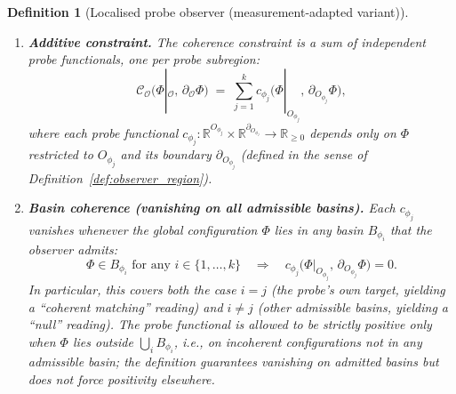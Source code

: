 \documentclass[12pt]{article}
\newtheorem{definition}[theorem]{Definition}
\newcommand{\Ocal}{\mathcal{O}}
\newcommand{\Ccal}{\mathcal{C}}
\begin{document}
\begin{definition}[Localised probe observer (measurement-adapted variant)]
\begin{enumerate}
    \item \textbf{Additive constraint.} The coherence constraint is a sum of independent probe functionals, one per probe subregion:
    \begin{equation}\label{eq:additive}
        \Ccal_\Ocal\!\bigl(\Phi|_\Ocal,\, \partial_\Ocal \Phi\bigr)
        \;=\; \sum_{j=1}^{k} c_{\phi_j}\!\bigl(\Phi|_{O_{\phi_j}},\, \partial_{O_{\phi_j}}\Phi\bigr),
    \end{equation}
    where each \emph{probe functional} $c_{\phi_j}: \mathbb{R}^{O_{\phi_j}} \times \mathbb{R}^{\partial_{O_{\phi_j}}} \to \mathbb{R}_{\geq 0}$ depends only on $\Phi$ restricted to $O_{\phi_j}$ and its boundary $\partial_{O_{\phi_j}}$ (defined in the sense of Definition~\ref{def:observer_region}).
    \item \textbf{Basin coherence (vanishing on all admissible basins).} Each $c_{\phi_j}$ vanishes whenever the global configuration $\Phi$ lies in any basin $B_{\phi_i}$ that the observer admits:
    \begin{equation}\label{eq:silence}
        \Phi \in B_{\phi_i} \text{ for any } i \in \{1, \ldots, k\} \quad\Longrightarrow\quad c_{\phi_j}\!\bigl(\Phi|_{O_{\phi_j}},\, \partial_{O_{\phi_j}}\Phi\bigr) = 0.
    \end{equation}
    In particular, this covers both the case $i = j$ (the probe's own target, yielding a ``coherent matching'' reading) and $i \neq j$ (other admissible basins, yielding a ``null'' reading). The probe functional is \emph{allowed to be} strictly positive only when $\Phi$ lies outside $\bigcup_i B_{\phi_i}$, i.e., on incoherent configurations not in any admissible basin; the definition guarantees vanishing on admitted basins but does not force positivity elsewhere.
\end{enumerate}
\end{definition}
\end{document}
